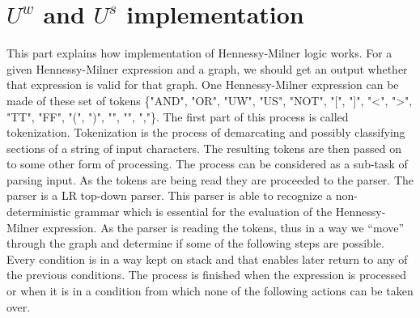\section{$U^w$ and $U^s$ implementation}

This part explains how implementation of Hennessy-Milner logic works. For a given Hennessy-Milner expression and a graph, we should get an output whether that expression is valid for that graph.  One Hennessy-Milner expression can be made of these set of tokens \{"AND", "OR", "UW", "US", "NOT", "[", "]", "<", ">", "TT", "FF", "(", ")", "{", "}", ","\}.  The first part of this process is called tokenization. Tokenization is the process of demarcating and possibly classifying sections of a string of input characters. The resulting tokens are then passed on to some other form of processing.
The process can be considered as a sub-task of parsing input. As the tokens are being read they are proceeded to the parser. The parser is a LR top-down parser. This parser is able to recognize a non-deterministic grammar which is essential for the evaluation of the Hennessy-Milner expression. As the parser is reading the tokens, thus in a way we “move” through the graph and determine if some of the following steps are possible. Every condition is in a way kept on stack and that enables later return to any of the previous conditions. The process is finished when the expression  is processed or when it is in a condition from which none of the following actions can be taken over.  

